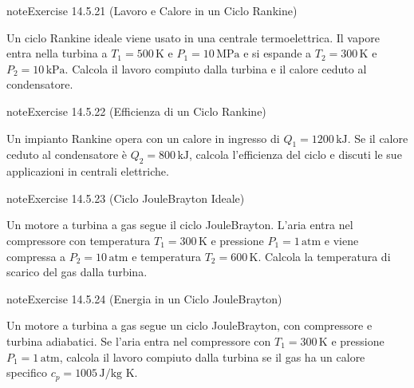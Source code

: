 \documentclass[letterpaper,10pt,italian]{jupyterBook}
\begin{document}
\begin{sphinxadmonition}{note}{Exercise 14.5.21 (Lavoro e Calore in un Ciclo Rankine)}



\sphinxAtStartPar
Un ciclo Rankine ideale viene usato in una centrale termoelettrica. Il vapore entra nella turbina a \(T_1 = 500 \, \text{K}\) e \(P_1 = 10 \, \text{MPa}\) e si espande a \(T_2 = 300 \, \text{K}\) e \(P_2 = 10 \, \text{kPa}\). Calcola il lavoro compiuto dalla turbina e il calore ceduto al condensatore.
\end{sphinxadmonition}
 \label{exercise:ch/thermodynamics/heat-engine-problems-exercise-21}

\begin{sphinxadmonition}{note}{Exercise 14.5.22 (Efficienza di un Ciclo Rankine)}



\sphinxAtStartPar
Un impianto Rankine opera con un calore in ingresso di \(Q_1 = 1200 \, \text{kJ}\). Se il calore ceduto al condensatore è \(Q_2 = 800 \, \text{kJ}\), calcola l’efficienza del ciclo e discuti le sue applicazioni in centrali elettriche.
\end{sphinxadmonition}
 \label{exercise:ch/thermodynamics/heat-engine-problems-exercise-22}

\begin{sphinxadmonition}{note}{Exercise 14.5.23 (Ciclo Joule\sphinxhyphen{}Brayton Ideale)}



\sphinxAtStartPar
Un motore a turbina a gas segue il ciclo Joule\sphinxhyphen{}Brayton. L’aria entra nel compressore con temperatura \(T_1 = 300 \, \text{K}\) e pressione \(P_1 = 1 \, \text{atm}\) e viene compressa a \(P_2 = 10 \, \text{atm}\) e temperatura \(T_2 = 600 \, \text{K}\). Calcola la temperatura di scarico del gas dalla turbina.
\end{sphinxadmonition}
 \label{exercise:ch/thermodynamics/heat-engine-problems-exercise-23}

\begin{sphinxadmonition}{note}{Exercise 14.5.24 (Energia in un Ciclo Joule\sphinxhyphen{}Brayton)}



\sphinxAtStartPar
Un motore a turbina a gas segue un ciclo Joule\sphinxhyphen{}Brayton, con compressore e turbina adiabatici. Se l’aria entra nel compressore con \(T_1 = 300 \, \text{K}\) e pressione \(P_1 = 1 \, \text{atm}\), calcola il lavoro compiuto dalla turbina se il gas ha un calore specifico \(c_p = 1005 \, \text{J/kg K}\).
\end{sphinxadmonition}
 \label{exercise:ch/thermodynamics/heat-engine-problems-exercise-24}
\end{document}
